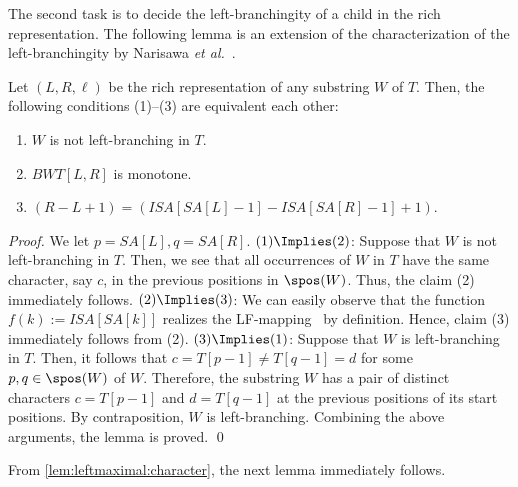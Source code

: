 The second task is to decide the left-branchingity of a child in the rich representation. 
The following lemma is an extension of the characterization of the left-branchingity by Narisawa \textit{et al.}~\cite[Lemma~10]{narisawa2007efficient}. 

\begin{lemma}\label{lem:leftmaximal:character}
Let $(L,R, \ell)$ be the rich representation of any substring $W$ of $T$. 
Then, the following conditions (1)--(3) are equivalent each other: 
\begin{enumerate}[(1)]
\item $W$ is not left-branching in $T$. 
\item $BWT[L, R]$ is monotone. 
\item $(R - L + 1) = (ISA[SA[L]-1] - ISA[SA[R]-1] + 1)$. 
\end{enumerate}
\end{lemma}

\begin{proof} 
We let $p = SA[L], q = SA[R]$. 
$(1)\Implies (2)$: Suppose that $W$ is not left-branching in $T$. Then, we see that all occurrences of $W$ in $T$ have the same character, say $c$, in the previous positions in $\spos(W)$. Thus, the claim (2) immediately follows. 
$(2) \Implies (3)$: We can easily observe that the function $f(k) := ISA[SA[k]]$ realizes the LF-mapping~\cite{Ferragina05:FM} by definition. Hence, claim (3) immediately follows from (2). 
$(3) \Implies (1)$: 
Suppose that $W$ is left-branching in $T$. Then, it follows that $c = T[p-1]\not= T[q-1] = d$ for some $p, q \in\spos(W)$ of $W$. 
Therefore, the substring $W$ has a pair of distinct characters $c = T[p-1]$ and $d = T[q-1]$ at the previous positions of its start positions. By contraposition, $W$ is left-branching. 
Combining the above arguments, the lemma is proved. 
\qed   
\end{proof}


From \cref{lem:leftmaximal:character}, the next lemma immediately follows. 

